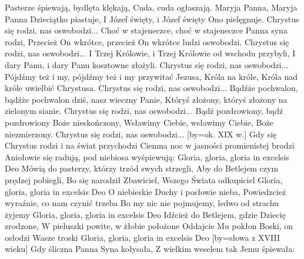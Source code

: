     Pasterze śpiewają, bydlęta klękają,
    Cuda, cuda ogłaszają.
\endchorus
\beginverse
    Maryja Panna, Maryja Panna Dzieciątko piastuje,
    I Józef święty, i Józef święty Ono pielęgnuje.
\endverse
\beginchorus
    Chrystus się rodzi, nas oswobodzi...
\endchorus
\beginverse
    Choć w stajeneczce, choć w stajeneczce Panna syna rodzi,
    Przecież On wkrótce, przecież On wkrótce ludzi oswobodzi.
\endverse
\beginchorus
    Chrystus się rodzi, nas oswobodzi...
\endchorus
\beginverse
    I Trzej Królowie, i Trzej Królowie od wschodu przybyli,
    I dary Panu, i dary Panu kosztowne złożyli.
\endverse
\beginchorus
    Chrystus się rodzi, nas oswobodzi...
\endchorus
\beginverse
    Pójdźmy też i my, pójdźmy też i my przywitać Jezusa,
    Króla na króle, Króla nad króle uwielbić Chrystusa.
\endverse
\beginchorus
    Chrystus się rodzi, nas oswobodzi...
\endchorus
\beginverse
    Bądźże pochwalon, bądźże pochwalon dziś, nasz wieczny Panie,
    Któryś złożony, któryś złożony na zielonym sianie.
\endverse
\beginchorus
    Chrystus się rodzi, nas oswobodzi...
\endchorus
\beginverse
    Bądź pozdrowiony, bądź pozdrowiony Boże nieskończony,
    Wsławimy Ciebie, wsławimy Ciebie, Boże niezmierzony.
\endverse
\beginchorus
    Chrystus się rodzi, nas oswobodzi...
\endchorus
\endsong
[by={ok. XIX w.}]
\beginverse
    Gdy się Chrystus rodzi i na świat przychodzi
    Ciemna noc w jasności promienistej brodzi
    Aniołowie się radują, pod niebiosa wyśpiewują:
\endverse
\beginchorus
        Gloria, gloria, gloria in excelsis Deo
\endchorus
\beginverse
    Mówią do pasterzy, którzy trzód swych strzegli,
    Aby do Betlejem czym prędzej pobiegli,
    Bo się narodził Zbawiciel, Wszego Świata odkupiciel
\endverse
\beginchorus
        Gloria, gloria, gloria in excelsis Deo
\endchorus
\beginverse
    O niebieskie Duchy i posłowie nieba,
    Powiedzcież wyraźnie, co nam czynić trzeba
    Bo my nic nie pojmujemy, ledwo od strachu żyjemy
\endverse
\beginchorus
        Gloria, gloria, gloria in excelsis Deo
\endchorus
\beginverse
    Idźcież do Betlejem, gdzie Dziecię zrodzone,
    W pieluszki powite, w żłobie położone
    Oddajcie Mu pokłon Boski, on osłodzi Wasze troski
\endverse
\beginchorus
        Gloria, gloria, gloria in excelsis Deo
\endchorus
\endsong
[by={słowa z XVIII wieku}]
\beginverse
    Gdy śliczna Panna Syna kołysała,
    Z wielkim weselem tak Jemu śpiewała:

